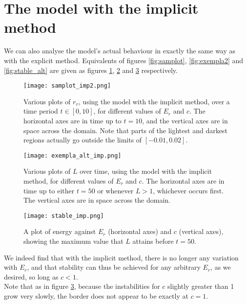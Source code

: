 \documentclass[11pt]{article}
\begin{document}
\section{The model with the implicit method}
We can also analyse the model's actual behaviour in exactly the same way as with the explicit method. Equivalents of figures \ref{fig:samplot}, \ref{fig:exempla2} and \ref{fig:stable_alt} are given as figures \ref{fig:samplot_imp2}, \ref{fig:exempla_alt_imp} and \ref{fig:stable_imp} respectively.
\begin{figure}[H]
\centering
\texttt{[image: samplot\_imp2.png]}
\caption{Various plots of $r_v$, using the model with the implicit method, over a time period $t\in[0,10]$, for different values of $E_r$ and $c$. The horizontal axes are in time up to $t=10$, and the vertical axes are in space across the domain. Note that parts of the lightest and darkest regions actually go outside the limits of $[-0.01,0.02]$.}
\label{fig:samplot_imp2}
\end{figure}
\begin{figure}[H]
\centering
\texttt{[image: exempla\_alt\_imp.png]}
\caption{Various plots of $L$ over time, using the model with the implicit method, for different values of $E_r$ and $c$. The horizontal axes are in time up to either $t=50$ or whenever $L>1$, whichever occurs first. The vertical axes are in space across the domain.}
\label{fig:exempla_alt_imp}
\end{figure}
\begin{figure}[H]
\centering
\texttt{[image: stable\_imp.png]}
\caption{A plot of energy against $E_r$ (horizontal axes) and $c$ (vertical axes), showing the maximum value that $L$ attains before $t=50$.}
\label{fig:stable_imp}
\end{figure}
We indeed find that with the implicit method, there is no longer any variation with $E_r$, and that stability can thus be achieved for any arbitrary $E_r$, as we desired, so long as $c<1$. \\
Note that as in figure \ref{fig:stable_imp}, because the instabilities for $c$ slightly greater than 1 grow very slowly, the border does not appear to be exactly at $c=1$.
\end{document}
